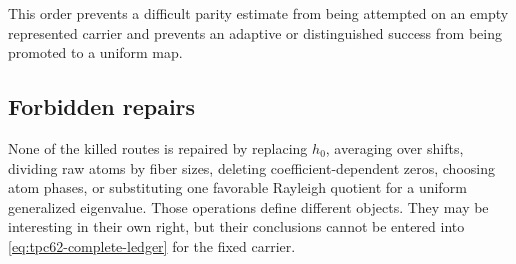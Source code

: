 This order prevents a difficult parity estimate from being attempted on an
empty represented carrier and prevents an adaptive or distinguished success
from being promoted to a uniform map.

\subsection{Forbidden repairs}

None of the killed routes is repaired by replacing \(h_0\), averaging over
shifts, dividing raw atoms by fiber sizes, deleting coefficient-dependent
zeros, choosing atom phases, or substituting one favorable Rayleigh quotient
for a uniform generalized eigenvalue.  Those operations define different
objects.  They may be interesting in their own right, but their conclusions
cannot be entered into \eqref{eq:tpc62-complete-ledger} for the fixed carrier.
